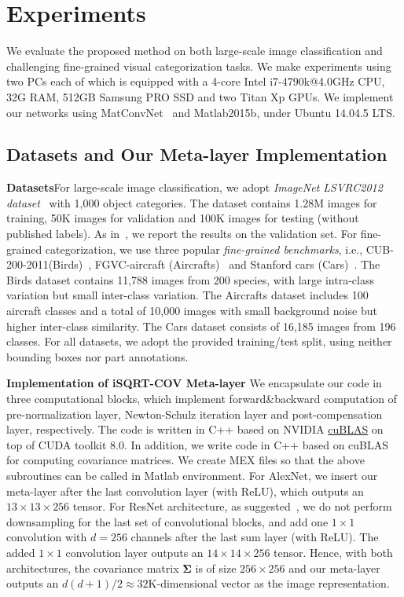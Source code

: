 \documentclass[10pt,twocolumn,letterpaper]{article}
\begin{document}
\section{Experiments}\label{section:experiments}

We  evaluate the proposed method on both large-scale image classification and challenging fine-grained visual categorization  tasks. We make experiments using two PCs each of which is equipped with a 4-core Intel i7-4790k@4.0GHz CPU, 32G RAM, 512GB Samsung  PRO SSD and two Titan Xp GPUs.  We implement our networks using  MatConvNet~\cite{vedaldi15matconvnet} and Matlab2015b, under Ubuntu 14.04.5 LTS.

\subsection{Datasets and Our Meta-layer Implementation}
\vspace{4pt}\noindent\textbf{Datasets}\quad For large-scale image classification, we adopt \textit{ImageNet LSVRC2012 dataset}~\cite{imagenet_cvpr09} with 1,000 object categories.  The dataset contains  1.28M images for training, 50K images for validation  and 100K images for testing (without published labels). As in~\cite{DBLP:journals/corr/IoffeS15,He_2016_CVPR}, we report the results on the validation set. For fine-grained categorization, we use three popular \textit{fine-grained benchmarks}, i.e.,  CUB-200-2011(Birds)~\cite{Wah2011The}, FGVC-aircraft (Aircrafts)~\cite{Maji2013Fine} and Stanford cars (Cars)~\cite{Krause20133D}.  The Birds dataset contains 11,788 images from 200 species, with large intra-class variation but small inter-class variation. The Aircrafts dataset includes 100 aircraft classes and a total of 10,000 images with small background noise but higher inter-class similarity. The Cars dataset  consists of 16,185 images from 196 classes. For all datasets, we adopt the provided training/test split, using neither bounding boxes nor part annotations.

\vspace{4pt}\noindent\textbf{Implementation of iSQRT-COV Meta-layer}\quad
We encapsulate our code in three computational blocks, which implement  forward\&backward  computation of pre-normalization layer, Newton-Schulz iteration layer and post-compensation layer, respectively. The code is written in C++ based on NVIDIA \href{http://docs.nvidia.com/cuda/cublas/}{cuBLAS} on top of  CUDA toolkit 8.0.  In addition, we write code in C++ based on cuBLAS for computing covariance matrices. We create MEX files so that the above subroutines can be called  in Matlab environment. For AlexNet, we insert  our meta-layer after the last convolution layer (with ReLU), which outputs an $13\times 13\times  256$ tensor. For ResNet architecture, as suggested~\cite{Li_2017_ICCV}, we do not perform downsampling for the last set of convolutional blocks, and  add one $1\times 1$ convolution with $d=256$ channels after the last sum layer (with ReLU). The added $1\times 1$ convolution layer outputs an $14\times 14\times 256$ tensor. Hence, with both architectures, the covariance matrix $\boldsymbol{\Sigma}$ is of size $256\times 256$ and our meta-layer outputs an $d(d+1)/2\approx32\mathrm{K}$-dimensional vector as the image representation.
\end{document}

